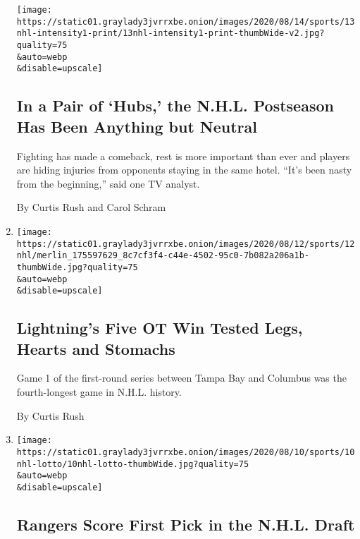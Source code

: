\begin{enumerate}
  \texttt{[image: https://static01.graylady3jvrrxbe.onion/images/2020/08/14/sports/13nhl-intensity1-print/13nhl-intensity1-print-thumbWide-v2.jpg?quality=75\\\&auto=webp\\\&disable=upscale]}

  \hypertarget{in-a-pair-of-hubs-the-nhl-postseason-has-been-anything-but-neutral}{%
  \subsection{In a Pair of `Hubs,' the N.H.L. Postseason Has Been
  Anything but
  Neutral}\label{in-a-pair-of-hubs-the-nhl-postseason-has-been-anything-but-neutral}}

  Fighting has made a comeback, rest is more important than ever and
  players are hiding injuries from opponents staying in the same hotel.
  ``It's been nasty from the beginning,'' said one TV analyst.

  By Curtis Rush and Carol Schram
\item
  \href{/2020/08/12/sports/hockey/longest-nhl-game-lightning-bluejackets.html}{}

  \texttt{[image: https://static01.graylady3jvrrxbe.onion/images/2020/08/12/sports/12nhl/merlin\_175597629\_8c7cf3f4-c44e-4502-95c0-7b082a206a1b-thumbWide.jpg?quality=75\\\&auto=webp\\\&disable=upscale]}

  \hypertarget{lightnings-five-ot-win-tested-legs-hearts-and-stomachs}{%
  \subsection{Lightning's Five OT Win Tested Legs, Hearts and
  Stomachs}\label{lightnings-five-ot-win-tested-legs-hearts-and-stomachs}}

  Game 1 of the first-round series between Tampa Bay and Columbus was
  the fourth-longest game in N.H.L. history.

  By Curtis Rush
\item
  \href{/2020/08/10/sports/hockey/nhl-draft-lottery-alexis-lafreniere.html}{}

  \texttt{[image: https://static01.graylady3jvrrxbe.onion/images/2020/08/10/sports/10nhl-lotto/10nhl-lotto-thumbWide.jpg?quality=75\\\&auto=webp\\\&disable=upscale]}

  \hypertarget{rangers-score-first-pick-in-the-nhl-draft}{%
  \subsection{Rangers Score First Pick in the N.H.L.
  Draft}\label{rangers-score-first-pick-in-the-nhl-draft}}


\end{enumerate}
